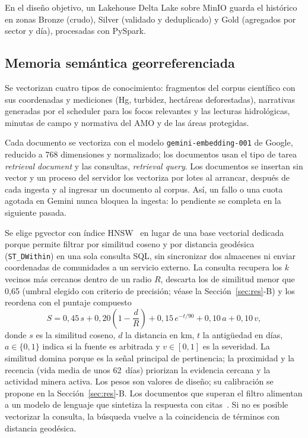 \documentclass[conference]{IEEEtran}
\begin{document}
En el diseño objetivo, un Lakehouse Delta Lake sobre MinIO guarda el histórico en zonas Bronze (crudo), Silver (validado y deduplicado) y Gold (agregados por sector y día), procesadas con PySpark.

\subsection{Memoria semántica georreferenciada}
Se vectorizan cuatro tipos de conocimiento: fragmentos del corpus científico con sus coordenadas y mediciones (Hg, turbidez, hectáreas deforestadas), narrativas generadas por el scheduler para los focos relevantes y las lecturas hidrológicas, minutas de campo y normativa del AMO y de las áreas protegidas.

Cada documento se vectoriza con el modelo \texttt{gemini-embedding-001} de Google, reducido a 768 dimensiones y normalizado; los documentos usan el tipo de tarea \emph{retrieval document} y las consultas, \emph{retrieval query}. Los documentos se insertan sin vector y un proceso del servidor los vectoriza por lotes al arrancar, después de cada ingesta y al ingresar un documento al corpus. Así, un fallo o una cuota agotada en Gemini nunca bloquea la ingesta: lo pendiente se completa en la siguiente pasada.

Se elige pgvector con índice HNSW~\cite{malkov2020} en lugar de una base vectorial dedicada porque permite filtrar por similitud coseno y por distancia geodésica (\texttt{ST\_DWithin}) en una sola consulta SQL, sin sincronizar dos almacenes ni enviar coordenadas de comunidades a un servicio externo. La consulta recupera los $k$ vecinos más cercanos dentro de un radio $R$, descarta los de similitud menor que 0,65 (umbral elegido con criterio de precisión; véase la Sección~\ref{sec:res}-B) y los reordena con el puntaje compuesto
\begin{equation}
\label{eq:score}
S = 0{,}45\,s + 0{,}20\left(1-\frac{d}{R}\right) + 0{,}15\,e^{-t/90} + 0{,}10\,a + 0{,}10\,v,
\end{equation}
donde $s$ es la similitud coseno, $d$ la distancia en km, $t$ la antigüedad en días, $a\in\{0,1\}$ indica si la fuente es arbitrada y $v\in[0,1]$ es la severidad. La similitud domina porque es la señal principal de pertinencia; la proximidad y la recencia (vida media de unos 62~días) priorizan la evidencia cercana y la actividad minera activa. Los pesos son valores de diseño; su calibración se propone en la Sección~\ref{sec:res}-B. Los documentos que superan el filtro alimentan a un modelo de lenguaje que sintetiza la respuesta con citas~\cite{lewis2020,gao2023}. Si no es posible vectorizar la consulta, la búsqueda vuelve a la coincidencia de términos con distancia geodésica.
\end{document}
